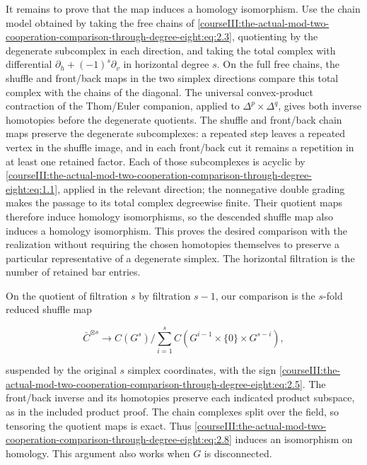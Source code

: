 It remains to prove that the map induces a homology isomorphism. Use the chain model obtained by taking the free chains of \eqref{courseIII:the-actual-mod-two-cooperation-comparison-through-degree-eight:eq:2.3}, quotienting by the degenerate subcomplex in each direction, and taking the total complex with differential \(\partial_h+(-1)^s\partial_v\) in horizontal degree \(s\). On the full free chains, the shuffle and front/back maps in the two simplex directions compare this total complex with the chains of the diagonal. The universal convex-product contraction of the Thom/Euler companion, applied to \(\Delta^p\times\Delta^q\), gives both inverse homotopies before the degenerate quotients. The shuffle and front/back chain maps preserve the degenerate subcomplexes: a repeated step leaves a repeated vertex in the shuffle image, and in each front/back cut it remains a repetition in at least one retained factor. Each of those subcomplexes is acyclic by \eqref{courseIII:the-actual-mod-two-cooperation-comparison-through-degree-eight:eq:1.1}, applied in the relevant direction; the nonnegative double grading makes the passage to its total complex degreewise finite. Their quotient maps therefore induce homology isomorphisms, so the descended shuffle map also induces a homology isomorphism. This proves the desired comparison with the realization without requiring the chosen homotopies themselves to preserve a particular representative of a degenerate simplex. The horizontal filtration is the number of retained bar entries.

On the quotient of filtration \(s\) by filtration \(s-1\), our comparison is the \(s\)-fold reduced shuffle map

\begin{equation}
\bar C^{\otimes s}\longrightarrow
 C(G^s)\Big/\sum_{i=1}^s C(G^{i-1}\times\{0\}\times G^{s-i}),
\label{courseIII:the-actual-mod-two-cooperation-comparison-through-degree-eight:eq:2.8}
\end{equation}

suspended by the original \(s\) simplex coordinates, with the sign \eqref{courseIII:the-actual-mod-two-cooperation-comparison-through-degree-eight:eq:2.5}. The front/back inverse and its homotopies preserve each indicated product subspace, as in the included product proof. The chain complexes split over the field, so tensoring the quotient maps is exact. Thus \eqref{courseIII:the-actual-mod-two-cooperation-comparison-through-degree-eight:eq:2.8} induces an isomorphism on homology. This argument also works when \(G\) is disconnected.

